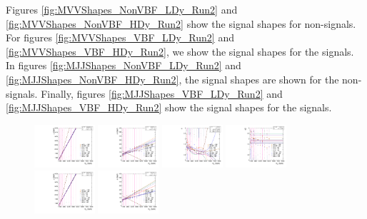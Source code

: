 Figures \ref{fig:MVVShapes_NonVBF_LDy_Run2} and \ref{fig:MVVShapes_NonVBF_HDy_Run2} show the \MVV signal shapes for non-\VBF signals.
For figures \ref{fig:MVVShapes_VBF_LDy_Run2} and \ref{fig:MVVShapes_VBF_HDy_Run2}, we show the \MVV signal shapes for the \VBF signals.
In figures \ref{fig:MJJShapes_NonVBF_LDy_Run2} and \ref{fig:MJJShapes_NonVBF_HDy_Run2}, the \MJ signal shapes are shown for the non-\VBF signals.
Finally, figures \ref{fig:MJJShapes_VBF_LDy_Run2} and \ref{fig:MJJShapes_VBF_HDy_Run2} show the \MJ signal shapes for the \VBF signals.

\begin{figure}[htbp]
  \centering
  \includegraphics[width=0.2\textwidth]{fig/2Dfit/paramSignalShape_allSig_MVV_HP_bb_LDy_MEAN.pdf}
  \includegraphics[width=0.2\textwidth]{fig/2Dfit/paramSignalShape_allSig_MVV_HP_bb_LDy_SIGMA.pdf}
  \includegraphics[width=0.2\textwidth]{fig/2Dfit/paramSignalShape_allSig_MVV_HP_bb_LDy_ALPHA1.pdf}
  \includegraphics[width=0.2\textwidth]{fig/2Dfit/paramSignalShape_allSig_MVV_HP_bb_LDy_ALPHA2.pdf}\\
  \includegraphics[width=0.2\textwidth]{fig/2Dfit/paramSignalShape_allSig_MVV_LP_bb_LDy_MEAN.pdf}
  \includegraphics[width=0.2\textwidth]{fig/2Dfit/paramSignalShape_allSig_MVV_LP_bb_LDy_SIGMA.pdf}

\end{figure}
